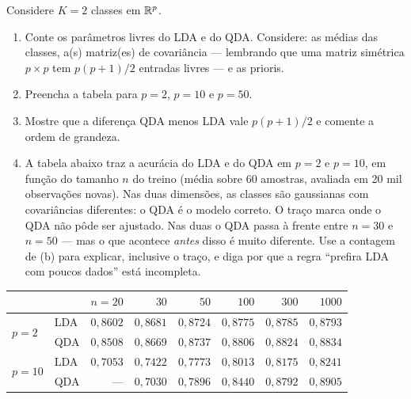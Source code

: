 \documentclass[11pt,a4paper]{article}
\begin{document}
\begin{exercicio}
Considere $K=2$ classes em $\mathbb{R}^p$.
\begin{enumerate}[label=(\alph*),leftmargin=1.1cm]
  \item Conte os parâmetros livres do LDA e do QDA. Considere: as médias das
        classes, a(s) matriz(es) de covariância --- lembrando que uma matriz
        simétrica $p\times p$ tem $p(p+1)/2$ entradas livres --- e as prioris.
  \item Preencha a tabela para $p=2$, $p=10$ e $p=50$.
  \item Mostre que a diferença QDA menos LDA vale $p(p+1)/2$ e comente a ordem de
        grandeza.
  \item A tabela abaixo traz a acurácia do LDA e do QDA em $p=2$ e $p=10$, em
        função do tamanho $n$ do treino (média sobre 60 amostras, avaliada em 20
        mil observações novas). Nas duas dimensões, as classes são gaussianas com
        covariâncias diferentes: o QDA é o modelo correto. O traço marca onde o
        QDA não pôde ser ajustado. Nas duas o QDA passa à frente entre $n=30$ e
        $n=50$ --- mas o que acontece \emph{antes} disso é muito diferente. Use a
        contagem de (b) para explicar, inclusive o traço, e diga por que a regra
        ``prefira LDA com poucos dados'' está incompleta.
\end{enumerate}

\begin{center}\small
\renewcommand{\arraystretch}{1.2}
\begin{tabular}{@{}llrrrrrr@{}}
\toprule
        &     & $n=20$ & $30$ & $50$ & $100$ & $300$ & $1000$ \\
\midrule
\multirow{2}{*}{$p=2$}  & LDA & $0{,}8602$ & $0{,}8681$ & $0{,}8724$ & $0{,}8775$ & $0{,}8785$ & $0{,}8793$ \\
                        & QDA & $0{,}8508$ & $0{,}8669$ & $0{,}8737$ & $0{,}8806$ & $0{,}8824$ & $0{,}8834$ \\
\midrule
\multirow{2}{*}{$p=10$} & LDA & $0{,}7053$ & $0{,}7422$ & $0{,}7773$ & $0{,}8013$ & $0{,}8175$ & $0{,}8241$ \\
                        & QDA & --- & $0{,}7030$ & $0{,}7896$ & $0{,}8440$ & $0{,}8792$ & $0{,}8905$ \\
\bottomrule
\end{tabular}
\end{center}
\end{exercicio}
\end{document}
